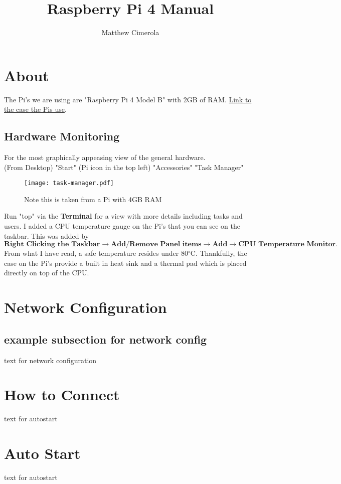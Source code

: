 \documentclass[12pt]{extarticle}
\author{Matthew Cimerola}
\title{Raspberry Pi 4 Manual}
\begin{document}
\maketitle

\tableofcontents
\newpage
\section{About}
The Pi's we are using are "Raspberry Pi 4 Model B" with 2GB of RAM. \href{https://www.amazon.com/Flirc-Raspberry-Pi-Case-Silver/dp/B07WG4DW52/ref=sr_1_5?keywords=Raspberry+Pi+4+Case&qid=1658852531&sr=8-5}{Link to the case the Pis use}. 
\subsection{Hardware Monitoring}
For the most graphically appeasing view of the general hardware.\\ 
(From Desktop) "Start" (Pi icon in the top left) \rightarrow "Accessories" \rightarrow "Task Manager" 

\begin{figure}[ht]
    \centering
    \texttt{[image: task-manager.pdf]}
    \caption{Note this is taken from a Pi with 4GB RAM}
\end{figure}
Run "top" via the \textbf{Terminal} for a view with more details including tasks and users. I added a CPU temperature gauge on the Pi's that you can see on the taskbar. This was added by $ \textbf{Right Clicking the Taskbar} \rightarrow \textbf{Add/Remove Panel items} \rightarrow \textbf{Add} \rightarrow \textbf{CPU Temperature Monitor}. $ From what I have read, a safe temperature resides under 80$^{\circ}$C. Thankfully, the case on the Pi's provide a built in heat sink and a thermal pad which is placed directly on top of the CPU.


\newpage
\section{Network Configuration}
\subsection{example subsection for network config}
text for network configuration

\newpage
\section{How to Connect}
text for autostart


\newpage
\section{Auto Start}
text for autostart
\end{document}
